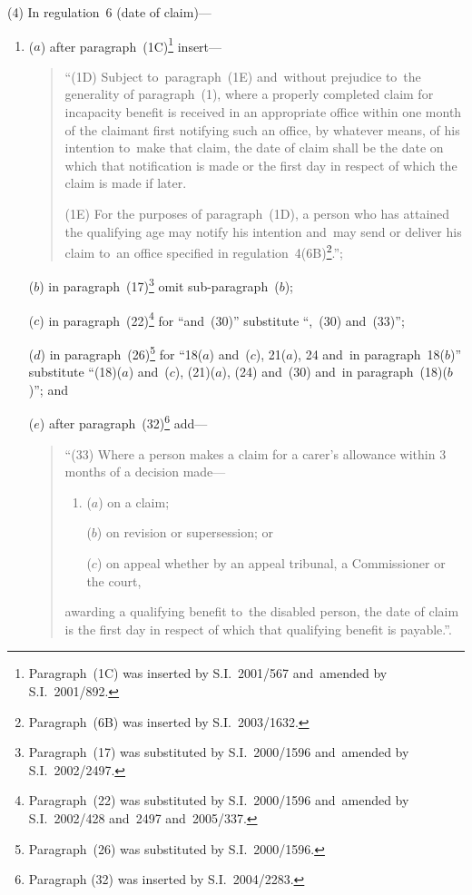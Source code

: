 \documentclass[12pt,a4paper]{article}
\begin{document}
(4) In regulation~6 (date of claim)—
\begin{enumerate}\item[]
($a$) after paragraph~(1C)\footnote{Paragraph~(1C) was inserted by S.I.~2001/567 and~amended by S.I.~2001/892.} insert—
\begin{quotation}
“(1D) Subject to~paragraph~(1E) and~without prejudice to~the generality of paragraph~(1), where a properly completed claim for incapacity benefit is received in an appropriate office within one month of the claimant first notifying such an office, by whatever means, of his intention to~make that claim, the date of claim shall be the date on which that notification is made or the first day in respect of which the claim is made if later.

(1E) For the purposes of paragraph~(1D), a person who has attained the qualifying age may notify his intention and~may send or deliver his claim to~an office specified in regulation~4(6B)\footnote{Paragraph~(6B) was inserted by S.I.~2003/1632.}.”;
\end{quotation}

($b$) in paragraph~(17)\footnote{Paragraph~(17) was substituted by S.I.~2000/1596 and~amended by S.I.~2002/2497.} omit sub-paragraph~($b$);

($c$) in paragraph~(22)\footnote{Paragraph~(22) was substituted by S.I.~2000/1596 and~amended by S.I.~2002/428 and~2497 and~2005/337.} for “and~(30)” substitute “,~(30) and~(33)”;

($d$) in paragraph~(26)\footnote{Paragraph~(26) was substituted by S.I.~2000/1596.} for “18($a$)  and~($c$), 21($a$), 24 and~in paragraph~18($b$)” substitute “(18)($a$)  and~($c$), (21)($a$), (24) and~(30) and~in paragraph~(18)($b$)”; and

($e$) after paragraph~(32)\footnote{Paragraph (32) was inserted by S.I.~2004/2283.} add—
\begin{quotation}
“(33) Where a person makes a claim for a carer’s allowance within 3 months of a decision made—
\begin{enumerate}\item[]
($a$) on a claim;

($b$) on revision or supersession; or

($c$) on appeal whether by an appeal tribunal, a Commissioner or the court,
\end{enumerate}
awarding a qualifying benefit to~the disabled person, the date of claim is the first day in respect of which that qualifying benefit is payable.”.
\end{quotation}
\end{enumerate}
\end{document}
